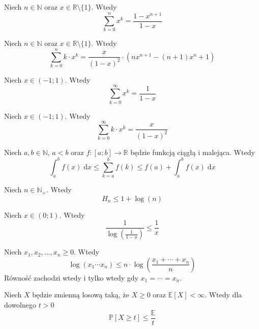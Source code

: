 \begin{summ}\label{summ:geo_0}
Niech $n\in\mathbb{N}$ oraz $x\in\mathbb{R}\setminus\{1\}$. Wtedy
\[
    \sum_{k=0}^{n} x^k = \frac{1-x^{n+1}}{1-x}
\]
\end{summ}

\begin{summ}\label{summ:geo_1}
Niech $n\in\mathbb{N}$ oraz $x\in\mathbb{R}\setminus\{1\}$. Wtedy
\[
    \sum_{k=0}^{n} k\cdot x^k=\frac{x}{{(1-x)}^2}\cdot (nx^{n+1}-(n+1)x^n+1)
\]
\end{summ}

\begin{summ}\label{summ:geo_0_inf}
Niech $x\in (-1;1)$. Wtedy
\[
    \sum_{k=0}^{\infty} x^k = \frac{1}{1-x}
\]
\end{summ}

\begin{summ}\label{summ:geo_1_inf}
Niech $x\in (-1;1)$. Wtedy
\[
    \sum_{k=0}^{\infty} k\cdot x^k=\frac{x}{{(1-x)}^2}
\]
\end{summ}

\begin{inequality}\label{inequality:approximation_of_sum_by_an_integral}
Niech $a,b\in\mathbb{N}$, $a<b$ oraz $f:[a;b]\to\mathbb{R}$ będzie funkcją ciągłą i malejąca. Wtedy
\[
    \int_{a}^b f(x)\; \mathrm{d}x \le \sum_{k=a}^{b} f(k)\le f(a) + \int_{a}^b f(x)\; \mathrm{d}x
\]
\end{inequality}

\begin{inequality}\label{inequality:harmonic_upper_bound}
Niech $n\in\mathbb{N}_+$. Wtedy
\[
    H_n \le 1 + \log(n)
\]
\end{inequality}

\begin{inequality}\label{inequality:log_vs_x}
Niech $x \in (0;1)$. Wtedy
\[
    \frac{1}{\log(\frac{1}{1-x})} \le \frac{1}{x}
\]
\end{inequality}

\begin{inequality}\label{inequality:AM_GM}
Niech $x_1,x_2,\dots,x_n\ge 0$. Wtedy
\[
    \log(x_1\cdots x_n) \le n\cdot \log\left(\frac{x_1 + \cdots + x_n}{n}\right)
\]
Równość zachodzi wtedy i tylko wtedy gdy $x_1=\cdots=x_n$.
\end{inequality}

\begin{inequality}\label{inequality:Markov}
Niech $X$ będzie zmienną losową taką, że $X\ge 0$ oraz $\mathbb{E}[X]< \infty$. Wtedy dla dowolnego $t>0$
\[
    \mathbb{P}[X\ge t] \le \frac{\mathbb{E}}{t}
\]
\end{inequality}

